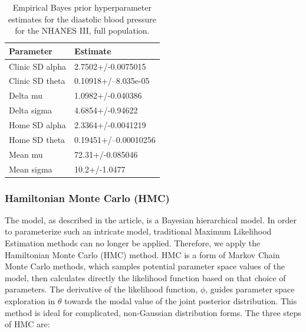 \documentclass[
]{article}
\begin{document}
\begin{table}

\caption{\label{tab:empestsD}Empirical Bayes prior hyperparameter estimates for the diastolic blood pressure for the NHANES III, full population.}
\centering
\begin{tabular}[t]{ll}
\toprule
Parameter & Estimate\\
\midrule
Clinic SD alpha & 2.7502+/-0.0075015\\
Clinic SD theta & 0.10918+/--8.035e-05\\
Delta mu & 1.0982+/-0.040386\\
Delta sigma & 4.6854+/-0.94622\\
Home SD alpha & 2.3364+/-0.0041219\\
\addlinespace
Home SD theta & 0.19451+/--0.00010256\\
Mean mu & 72.31+/-0.085046\\
Mean sigma & 10.2+/-1.0477\\
\bottomrule
\end{tabular}
\end{table}

\hypertarget{hamiltonian-monte-carlo-hmc}{%
\subsubsection{Hamiltonian Monte Carlo (HMC)}\label{hamiltonian-monte-carlo-hmc}}

The model, as described in the article, is a Bayesian hierarchical model. In order to parameterize such an intricate model, traditional Maximum Likelihood Estimation methods can no longer be applied. Therefore, we apply the Hamiltonian Monte Carlo (HMC) method. HMC is a form of Markov Chain Monte Carlo methods, which samples potential parameter space values of the model, then calculates directly the likelihood function based on that choice of parameters. The derivative of the likelihood function, \(\phi\), guides parameter space exploration in \(\theta\) towards the modal value of the joint posterior distribution. This method is ideal for complicated, non-Gaussian distribution forms. The three steps of HMC are:
\end{document}
